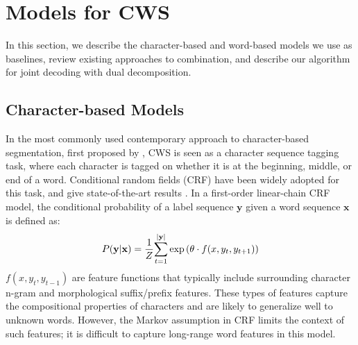 \section{Models for CWS}

In this section, we describe the character-based and word-based models we use as baselines, review existing approaches to combination, and describe our algorithm for joint decoding with dual decomposition.


\subsection{Character-based Models}
In the most commonly used contemporary approach to character-based segmentation, first proposed by \cite{Xue:2003:IJCLCLP}, CWS is seen as a character sequence tagging task, where each character is tagged on whether it is at the beginning, middle, or end of a word. Conditional random fields (CRF) \cite{Lafferty:2001:ICML} have been widely adopted for this task, and give state-of-the-art results \cite{Tseng:2005:SIGHAN}. In a first-order linear-chain CRF model, the conditional probability of a label sequence $\mathbf{y}$ given a word sequence $\mathbf{x}$ is defined as:
\begin{align*}\vspace{-10em}
P(\mathbf{y} | \mathbf{x}) = \frac{1}{Z}{ \sum\limits_{t=1}^{|\mathbf{y}|}{ \exp\left( \theta \cdot {f}(x, y_t, y_{t+1}) \right) }}
\vspace{-10em}
\end{align*}
\noindent $f(x, y_{t}, y_{t-1})$ are feature functions that typically include surrounding character n-gram and morphological suffix/prefix features. These types of features capture the compositional properties of characters and are likely to generalize well to unknown words.  
However, the Markov assumption in CRF limits the context of such features; it is difficult to capture long-range word features in this model. 

